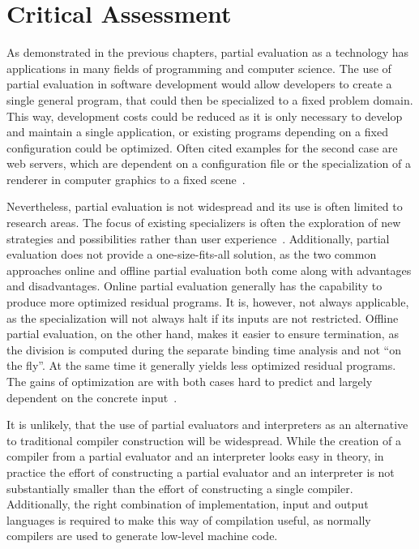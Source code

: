 
\newpage
\section{Critical Assessment}\label{sec:discussion}

As demonstrated in the previous chapters, partial evaluation as a technology has applications in many fields of programming and computer science.
The use of partial evaluation in software development would allow developers to create a single general program, that could then be specialized to a fixed problem domain.
This way, development costs could be reduced as it is only necessary to develop and maintain a single application, or existing programs depending on a fixed configuration could be optimized.
Often cited examples for the second case are web servers, which are dependent on a configuration file or the specialization of a renderer in computer graphics to a fixed scene~\cite{Jones_PartialEvaluation}.

Nevertheless, partial evaluation is not widespread and its use is often limited to research areas.
The focus of existing specializers is often the exploration of new strategies and possibilities rather than user experience~\cite{Cook_TutorialOnlinePartialEvaluation}.
Additionally, partial evaluation does not provide a one-size-fits-all solution, as the two common approaches online and offline partial evaluation both come along with advantages and disadvantages.
Online partial evaluation generally has the capability to produce more optimized residual programs.
It is, however, not always applicable, as the specialization will not always halt if its inputs are not restricted.
Offline partial evaluation, on the other hand, makes it easier to ensure termination, as the division is computed during the separate binding time analysis and not \enquote{on the fly}.
At the same time it generally yields less optimized residual programs.
The gains of optimization are with both cases hard to predict and largely dependent on the concrete input~\cite{Sumii_HybridApproach}.

It is unlikely, that the use of partial evaluators and interpreters as an alternative to traditional compiler construction will be widespread.
While the creation of a compiler from a partial evaluator and an interpreter looks easy in theory, in practice the effort of constructing a partial evaluator and an interpreter is not substantially smaller than the effort of constructing a single compiler.
Additionally, the right combination of implementation, input and output languages is required to make this way of compilation useful, as normally compilers are used to generate low-level machine code.


